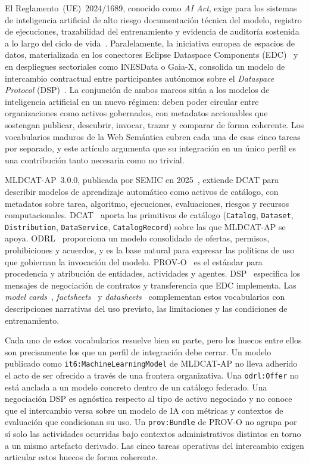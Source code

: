 \documentclass[11pt,a4paper]{article}
\newcommand{\code}[1]{\texttt{#1}}
\begin{document}
El Reglamento~(UE)~2024/1689, conocido como \emph{AI Act}, exige para los sistemas de inteligencia artificial de alto riesgo documentación técnica del modelo, registro de ejecuciones, trazabilidad del entrenamiento y evidencia de auditoría sostenida a lo largo del ciclo de vida~\cite{aiact}. Paralelamente, la iniciativa europea de espacios de datos, materializada en los conectores Eclipse Dataspace Components (EDC)~\cite{edc} y en despliegues sectoriales como INESData o Gaia-X, consolida un modelo de intercambio contractual entre participantes autónomos sobre el \emph{Dataspace Protocol} (DSP)~\cite{dsp}. La conjunción de ambos marcos sitúa a los modelos de inteligencia artificial en un nuevo régimen: deben poder circular entre organizaciones como activos gobernados, con metadatos accionables que sostengan publicar, descubrir, invocar, trazar y comparar de forma coherente. Los vocabularios maduros de la Web Semántica cubren cada una de esas cinco tareas por separado, y este artículo argumenta que su integración en un único perfil es una contribución tanto necesaria como no trivial.

MLDCAT-AP~3.0.0, publicada por SEMIC en 2025~\cite{mldcatap}, extiende DCAT para describir modelos de aprendizaje automático como activos de catálogo, con metadatos sobre tarea, algoritmo, ejecuciones, evaluaciones, riesgos y recursos computacionales. DCAT~\cite{dcat2} aporta las primitivas de catálogo (\code{Catalog}, \code{Dataset}, \code{Distribution}, \code{DataService}, \code{CatalogRecord}) sobre las que MLDCAT-AP se apoya. ODRL~\cite{odrl22} proporciona un modelo consolidado de ofertas, permisos, prohibiciones y acuerdos, y es la base natural para expresar las políticas de uso que gobiernan la invocación del modelo. PROV-O~\cite{provo} es el estándar para procedencia y atribución de entidades, actividades y agentes. DSP~\cite{dsp} especifica los mensajes de negociación de contratos y transferencia que EDC implementa. Las \emph{model cards}~\cite{mitchell19}, \emph{factsheets}~\cite{arnold19} y \emph{datasheets}~\cite{gebru21} complementan estos vocabularios con descripciones narrativas del uso previsto, las limitaciones y las condiciones de entrenamiento.

Cada uno de estos vocabularios resuelve bien su parte, pero los huecos entre ellos son precisamente los que un perfil de integración debe cerrar. Un modelo publicado como \code{it6:MachineLearningModel} de MLDCAT-AP no lleva adherido el acto de ser ofrecido a través de una frontera organizativa. Una \code{odrl:Offer} no está anclada a un modelo concreto dentro de un catálogo federado. Una negociación DSP es agnóstica respecto al tipo de activo negociado y no conoce que el intercambio versa sobre un modelo de IA con métricas y contextos de evaluación que condicionan su uso. Un \code{prov:Bundle} de PROV-O no agrupa por sí solo las actividades ocurridas bajo contextos administrativos distintos en torno a un mismo artefacto derivado. Las cinco tareas operativas del intercambio exigen articular estos huecos de forma coherente.
\end{document}
